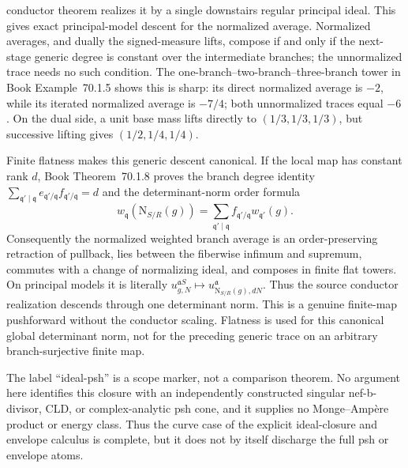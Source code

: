 \documentclass[11pt,a4paper]{article}
\theoremstyle{definition}
\theoremstyle{remark}
\begin{document}
conductor theorem realizes it by a single downstairs regular principal
ideal.  This gives exact principal-model descent for the normalized average.
Normalized averages, and dually the signed-measure lifts, compose if and only
if the next-stage generic degree is constant over the intermediate branches;
the unnormalized trace needs no such condition.  The
one-branch--two-branch--three-branch tower in
Book Example~70.1.5 shows this is sharp: its direct
normalized average is \(-2\), while its iterated normalized average is
\(-7/4\); both unnormalized traces equal \(-6\).  On the dual side, a unit
base mass lifts directly to \((1/3,1/3,1/3)\), but successive lifting gives
\((1/2,1/4,1/4)\).

Finite flatness makes this generic descent canonical.  If the local map has
constant rank \(d\),
Book Theorem~70.1.8 proves the branch degree
identity
\(\sum_{\mathfrak q'\mid\mathfrak q}e_{\mathfrak q'/\mathfrak q}
f_{\mathfrak q'/\mathfrak q}=d\) and the determinant-norm order formula
\[
 w_{\mathfrak q}(\mathrm N_{S/R}(g))
   =\sum_{\mathfrak q'\mid\mathfrak q}
      f_{\mathfrak q'/\mathfrak q}w_{\mathfrak q'}(g).
\]
Consequently the normalized weighted branch average is an order-preserving
retraction of pullback, lies between the fiberwise infimum and supremum,
commutes with a change of normalizing ideal, and composes in finite flat
towers.  On principal models it is literally
\(u^{\mathfrak aS}_{g,N}\mapsto
u^{\mathfrak a}_{\mathrm N_{S/R}(g),dN}\).  Thus the source conductor
realization descends through one determinant norm.  This is a genuine
finite-map pushforward without the conductor scaling.  Flatness is used for
this canonical global determinant norm, not for the preceding generic trace
on an arbitrary branch-surjective finite map.

The label ``ideal-psh'' is a scope marker, not a comparison theorem.  No
argument here identifies this closure with an independently constructed
singular nef-b-divisor, CLD, or complex-analytic psh cone, and it supplies no
Monge--Amp\`ere product or energy class.  Thus the curve case of the explicit
ideal-closure and envelope calculus is complete, but it does not by itself
discharge the full psh or envelope atoms.
\end{document}
